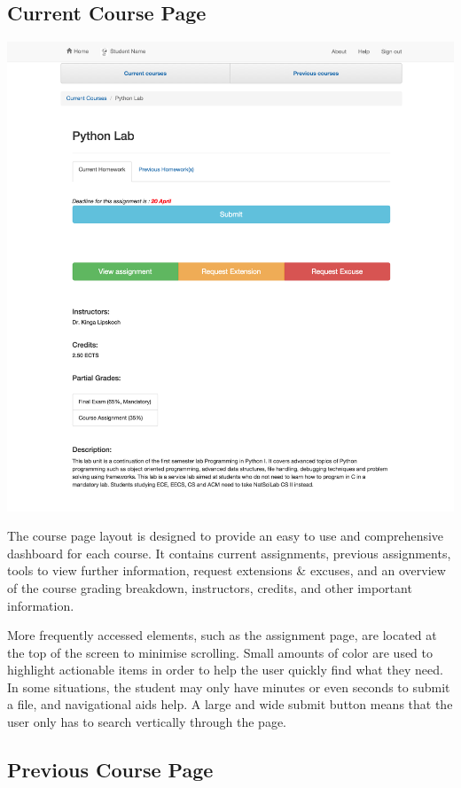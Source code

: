 \subsection{Current Course Page}

\includegraphics[width=\textwidth]{screenshots/PythonLab.png}

The course page layout is designed to provide an easy to use and comprehensive dashboard for each course. It contains current assignments, previous assignments, tools to view further information, request extensions \& excuses, and an overview of the course grading breakdown, instructors, credits, and other important information. 

More frequently accessed elements, such as the assignment page, are located at the top of the screen to minimise scrolling. Small amounts of color are used to highlight actionable items in order to help the user quickly find what they need. In some situations, the student may only have minutes or even seconds to submit a file, and navigational aids help. A large and wide submit button means that the user only has to search vertically through the page.

\subsection{Previous Course Page}

